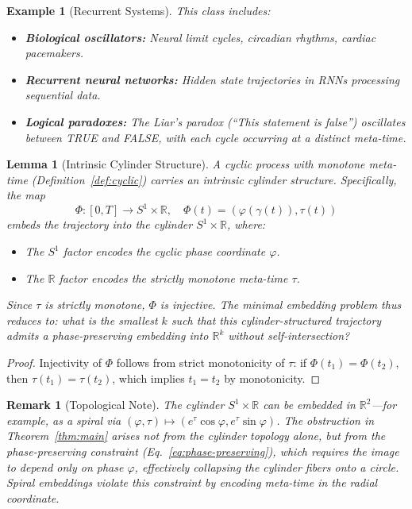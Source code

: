 \documentclass[12pt]{article}
\newtheorem{lemma}[theorem]{Lemma}
\newtheorem{remark}[theorem]{Remark}
\newtheorem{example}[theorem]{Example}
\newcommand{\R}{\mathbb{R}}
\begin{document}
\begin{example}[Recurrent Systems]
This class includes:
\begin{itemize}
    \item \textbf{Biological oscillators:} Neural limit cycles, circadian rhythms, cardiac pacemakers.
    \item \textbf{Recurrent neural networks:} Hidden state trajectories in RNNs processing sequential data.
    \item \textbf{Logical paradoxes:} The Liar's paradox (``This statement is false'') oscillates between TRUE and FALSE, with each cycle occurring at a distinct meta-time.
\end{itemize}
\end{example}

\begin{lemma}[Intrinsic Cylinder Structure]\label{lem:cylinder}
A cyclic process with monotone meta-time (Definition~\ref{def:cyclic}) carries an intrinsic \emph{cylinder structure}. Specifically, the map
\begin{equation}
    \Phi: [0,T] \to S^1 \times \R, \quad \Phi(t) = (\varphi(\gamma(t)), \tau(t))
\end{equation}
embeds the trajectory into the cylinder $S^1 \times \R$, where:
\begin{itemize}
    \item The $S^1$ factor encodes the cyclic phase coordinate $\varphi$.
    \item The $\R$ factor encodes the strictly monotone meta-time $\tau$.
\end{itemize}
Since $\tau$ is strictly monotone, $\Phi$ is injective. The minimal embedding problem thus reduces to: \emph{what is the smallest $k$ such that this cylinder-structured trajectory admits a phase-preserving embedding into $\R^k$ without self-intersection?}
\end{lemma}

\begin{proof}
Injectivity of $\Phi$ follows from strict monotonicity of $\tau$: if $\Phi(t_1) = \Phi(t_2)$, then $\tau(t_1) = \tau(t_2)$, which implies $t_1 = t_2$ by monotonicity.
\end{proof}

\begin{remark}[Topological Note]
The cylinder $S^1 \times \R$ \emph{can} be embedded in $\R^2$---for example, as a spiral via $(\varphi, \tau) \mapsto (e^\tau \cos\varphi, e^\tau \sin\varphi)$. The obstruction in Theorem~\ref{thm:main} arises not from the cylinder topology alone, but from the \emph{phase-preserving} constraint (Eq.~\ref{eq:phase-preserving}), which requires the image to depend only on phase $\varphi$, effectively collapsing the cylinder fibers onto a circle. Spiral embeddings violate this constraint by encoding meta-time in the radial coordinate.
\end{remark}
\end{document}
